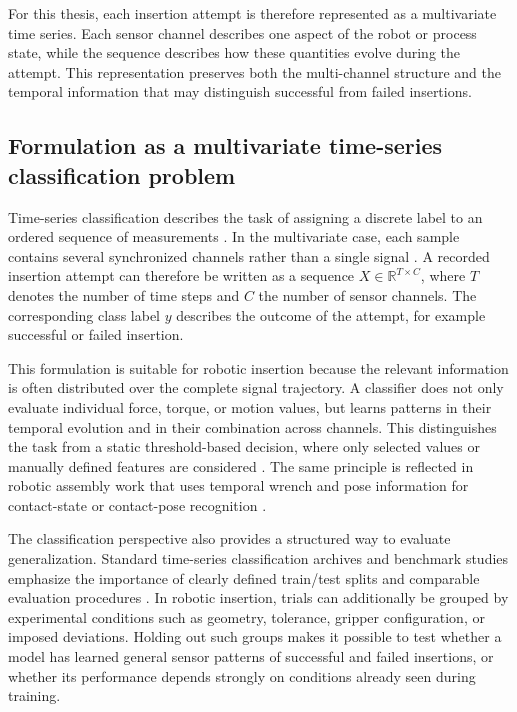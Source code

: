 For this thesis, each insertion attempt is therefore represented as a multivariate time series. Each sensor channel describes one aspect of the robot or process state, while the sequence describes how these quantities evolve during the attempt. This representation preserves both the multi-channel structure and the temporal information that may distinguish successful from failed insertions.

\subsection{Formulation as a multivariate time-series classification problem}

Time-series classification describes the task of assigning a discrete label to an ordered sequence of measurements \cite{fawazDeepLearningTime2019}. In the multivariate case, each sample contains several synchronized channels rather than a single signal \cite{bagnallGreatTimeSeries2017,ruizGreatMultivariateTime2021}. A recorded insertion attempt can therefore be written as a sequence $X \in \mathbb{R}^{T \times C}$, where $T$ denotes the number of time steps and $C$ the number of sensor channels. The corresponding class label $y$ describes the outcome of the attempt, for example successful or failed insertion.

This formulation is suitable for robotic insertion because the relevant information is often distributed over the complete signal trajectory. A classifier does not only evaluate individual force, torque, or motion values, but learns patterns in their temporal evolution and in their combination across channels. This distinguishes the task from a static threshold-based decision, where only selected values or manually defined features are considered \cite{fawazDeepLearningTime2019}. The same principle is reflected in robotic assembly work that uses temporal wrench and pose information for contact-state or contact-pose recognition \cite{jasimContactstateMonitoringForceguided2014,jinContactPoseIdentification2021a}.

The classification perspective also provides a structured way to evaluate generalization. Standard time-series classification archives and benchmark studies emphasize the importance of clearly defined train/test splits and comparable evaluation procedures \cite{dauUCRTimeSeries2019,bagnallGreatTimeSeries2017,ruizGreatMultivariateTime2021}. In robotic insertion, trials can additionally be grouped by experimental conditions such as geometry, tolerance, gripper configuration, or imposed deviations. Holding out such groups makes it possible to test whether a model has learned general sensor patterns of successful and failed insertions, or whether its performance depends strongly on conditions already seen during training.

